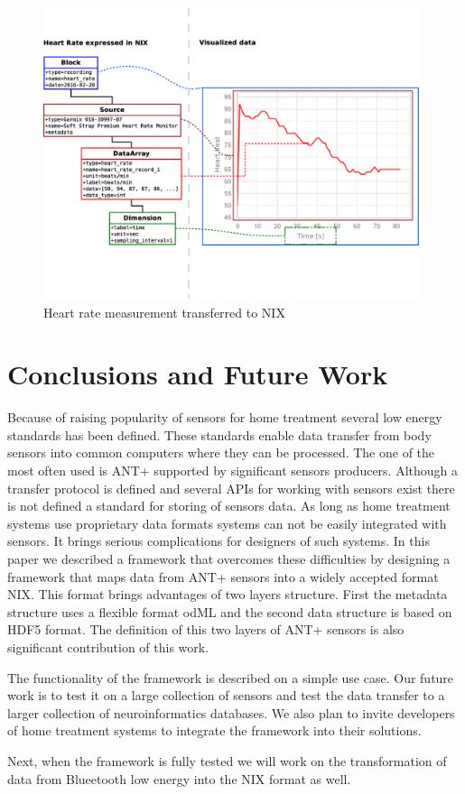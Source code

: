 \documentclass[conference]{IEEEtran}
\begin{document}
\begin{figure}
\centering\includegraphics[width=11cm]{NIX-example}
\caption{\label{NIX-ex}Heart rate measurement transferred to NIX}
\end{figure}



\section{Conclusions and Future Work}\label{sec:future-work}

Because of raising popularity of sensors for home treatment several low energy standards has been defined. These standards enable data transfer from body sensors into common computers where they can be processed. The one of the most often used is ANT+ supported by significant sensors producers. Although a transfer protocol is defined and several APIs for working with sensors exist there is not defined a standard for storing of sensors data. As long as home treatment systems use proprietary data formats systems can not be easily integrated with sensors. It brings serious complications for designers of such systems. In this paper we described a framework that overcomes these difficulties by designing a framework that maps data from ANT+ sensors into a widely accepted format NIX. This format brings advantages of two layers structure. First the metadata structure uses a flexible format odML and the second data structure is based on HDF5 format. The definition of this two layers of ANT+ sensors is also significant contribution of this work. 

The functionality of the framework is described on a simple use case. Our future work is to test it on a large collection of sensors and test the data transfer to a larger collection of neuroinformatics databases. We also plan to invite developers of home treatment systems to integrate the framework into their solutions. 

Next, when the framework is fully tested we will work on the transformation of data from Blueetooth low energy into the NIX format as well. 






\end{document}
